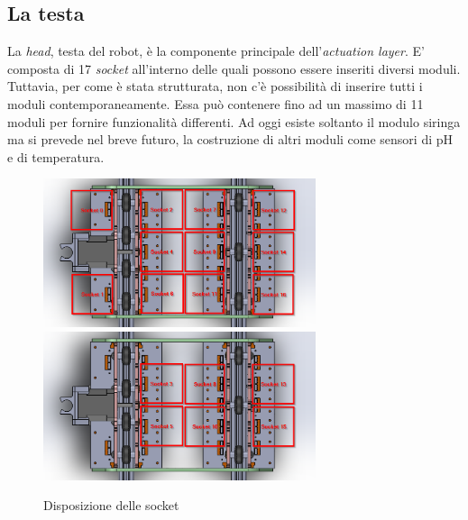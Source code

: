 \subsection{La testa}
La \emph{head}, testa del robot, è la componente principale dell'\emph{actuation layer}. E' composta di 17 \emph{socket} all'interno delle quali possono essere inseriti diversi moduli. Tuttavia, per come è stata strutturata, non c'è possibilità di inserire tutti i moduli contemporaneamente. Essa può contenere fino ad un massimo di 11 moduli per fornire funzionalità differenti. Ad oggi esiste soltanto il modulo siringa ma si prevede nel breve futuro, la costruzione di altri moduli come sensori di pH e di temperatura. 
	\begin{figure}[h]
	\centering
   		{\includegraphics[width=8cm]{immagini/head_sockets_1.png}}
 	\hspace{5mm}
   		{\includegraphics[width=8cm]{immagini/head_sockets.png}}
	\caption{Disposizione delle socket}
 	\end{figure}


